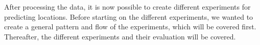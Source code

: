 After processing the data, it is now possible to create different experiments for predicting locations. Before starting on the different experiments, we wanted to create a general pattern and flow of the experiments, which will be covered first. Thereafter, the different experiments and their evaluation will be covered.